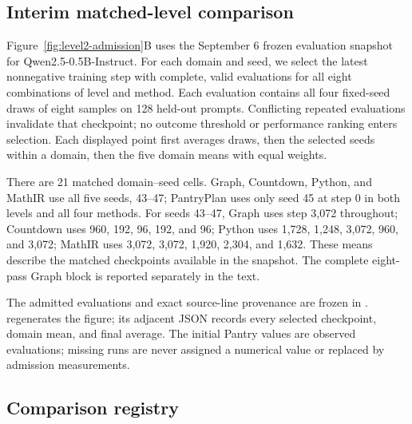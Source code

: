 \subsection{Interim matched-level comparison}
\label{app:level2-interim}

Figure~\ref{fig:level2-admission}B uses the September 6 frozen evaluation
snapshot for Qwen2.5-0.5B-Instruct. For each domain and seed, we select the
latest nonnegative training step with complete, valid evaluations for all
eight combinations of level and method. Each evaluation contains all four
fixed-seed draws of eight samples on 128 held-out prompts. Conflicting
repeated evaluations invalidate that checkpoint; no outcome threshold or
performance ranking enters selection. Each displayed point first averages
draws, then the selected seeds within a domain, then the five domain means
with equal weights.

There are 21 matched domain--seed cells. Graph, Countdown, Python, and MathIR
use all five seeds, 43--47; PantryPlan uses only seed 45 at step 0 in both
levels and all four methods. For seeds 43--47, Graph uses step 3,072 throughout;
Countdown uses 960, 192, 96, 192, and 96; Python uses 1,728, 1,248, 3,072,
960, and 3,072; MathIR uses 3,072, 3,072, 1,920, 2,304, and 1,632.
These means describe the matched checkpoints available in the snapshot.
The complete eight-pass Graph block is reported separately in the text.

The admitted evaluations and exact source-line provenance are frozen in
.
 regenerates the figure;
its adjacent JSON records every selected checkpoint, domain mean, and final
average. The initial Pantry values are observed evaluations; missing runs
are never assigned a numerical value or replaced by admission measurements.

\subsection{Comparison registry}
\label{app:program-registry}

